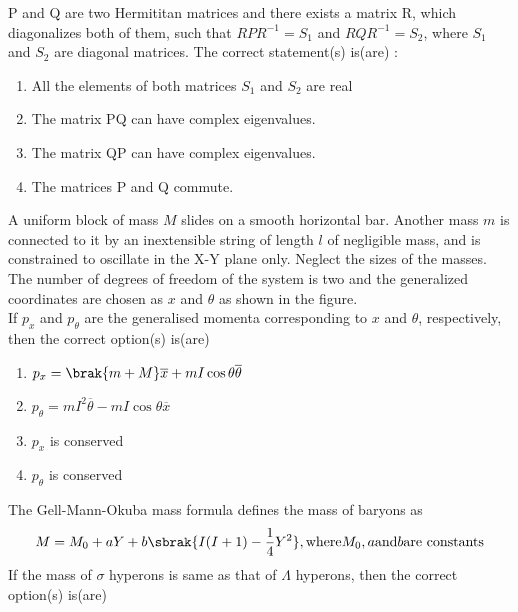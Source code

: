 \iffalse
\title{GATE Questions 18}
\author{EE24BTECH11012 - Bhavanisankar G S}
\section{ph}
\chapter{2021}
\fi
	\item P and Q are two Hermititan matrices and there exists a matrix R, which diagonalizes both of them, such that $RPR^{-1} = S_1$ and $RQR^{-1} = S_2$, where $S_1$ and $S_2$ are diagonal matrices. The correct statement(s) is(are) :
		\begin{enumerate}
			\item All the elements of both matrices $S_1$ and $S_2$ are real
			\item The matrix PQ can have complex eigenvalues.
			\item The matrix QP can have complex eigenvalues.
			\item The matrices P and Q commute.
		\end{enumerate}
	\item A uniform block of mass $M$ slides on a smooth horizontal bar. Another mass $m$ is connected to it by an inextensible string of length $l$ of negligible mass, and is constrained to oscillate in the X-Y plane only. Neglect the sizes of the masses. The number of degrees of freedom of the system is two and the generalized coordinates are chosen as $x$ and $\theta$ as shown in the figure. \\
		If $p_x$ and $p_{\theta}$ are the generalised momenta corresponding to $x$ and $\theta$, respectively, then the correct option(s) is(are)
		\begin{enumerate}
	\item $p_x = \brak{m+M} \overline{x} + mI\cos{\theta} \overline{\theta}$
	\item $p_{\theta} = mI^2 \overline{\theta} - mI \cos{\theta} \overline{x}$
	\item $p_x$ is conserved
	\item $p_{\theta}$ is conserved
		\end{enumerate}
	\item The Gell-Mann-Okuba mass formula defines the mass of baryons as 
		$$ M = M_0 + aY + b \sbrak{I(I+1) - \frac{1}{4} Y^2}, \text{where} M_0, a \text{and} b \text{are constants}$$
		If the mass of $\sigma$ hyperons is same as that of $\Lambda$ hyperons, then the correct option(s) is(are)
